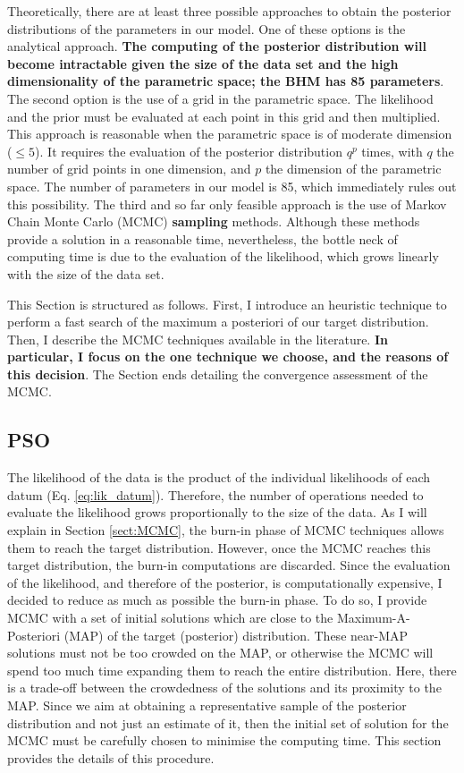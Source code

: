 Theoretically, there are at least three possible approaches to obtain the posterior distributions of the parameters in our model. One of these options is the analytical approach. \textbf{The computing of the posterior distribution will become intractable given the size of the data set and the high dimensionality of the parametric space; the BHM has 85 parameters}. The second option is the use of a grid in the parametric space. The likelihood and the prior must be evaluated at each point in this grid and then multiplied. This approach is reasonable when the parametric space is of moderate dimension ($\leq 5$). It requires the evaluation of the posterior distribution $q^p$ times, with $q$ the number of grid points in one dimension, and $p$ the dimension of the parametric space. The number of parameters in our model is 85, which immediately rules out this possibility. The third and so far only feasible approach is the use of Markov Chain Monte Carlo (MCMC) \textbf{sampling} methods. Although these methods provide a solution in a reasonable time, nevertheless, the bottle neck of computing time is due to the evaluation of the likelihood, which grows linearly with the size of the data set. 

This Section is structured as follows. First, I introduce an heuristic technique to perform a fast search of the maximum a posteriori of our target distribution. Then, I describe the MCMC techniques available in the literature.\textbf{ In particular, I focus on the one technique we choose, and the reasons of this decision}. The Section ends detailing the convergence assessment of the MCMC.

\subsection{PSO}

The likelihood of the data is the product of the individual likelihoods of each datum (Eq. \ref{eq:lik_datum}). Therefore, the number of operations needed to evaluate the likelihood grows proportionally to the size of the data. As I will explain in Section \ref{sect:MCMC}, the burn-in phase of MCMC techniques allows them to reach the target distribution. However, once the MCMC reaches this target distribution, the burn-in computations are discarded. Since the evaluation of the likelihood, and therefore of the posterior, is computationally expensive, I decided to reduce as much as possible the burn-in phase. To do so, I provide MCMC with a set of initial solutions which are close to the Maximum-A-Posteriori (MAP) of the target (posterior) distribution. These near-MAP solutions must not be too crowded on the MAP, or otherwise the MCMC will spend too much time expanding them to reach the entire distribution. Here, there is a trade-off between the crowdedness of the solutions and its proximity to the MAP. Since we aim at obtaining a representative sample of the posterior distribution and not just an estimate of it, then the initial set of solution for the MCMC must be carefully chosen to minimise the computing time. This section provides the details of this procedure. 

